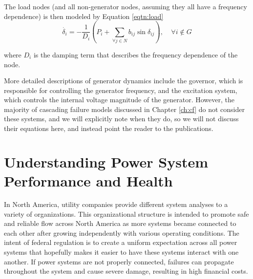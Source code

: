 The load nodes (and all non-generator nodes, assuming they all have a frequency dependence) is then modeled by Equation \ref{eqtn:load}
\begin{equation}
\label{eqtn:load}
\dot{\delta_i} = -\frac{1}{D_i}(P_i + \sum_{\forall j \in N} b_{ij} \sin \delta_{ij}),\ \ \ \ \  \forall i \notin G
\end{equation}

where $D_i$ is the damping term that describes the frequency dependence of the node.  


More detailed descriptions of generator dynamics include the governor, which is responsible for controlling the generator frequency, and the excitation system, which controls the internal voltage magnitude of the generator.  However, the majority of cascading failure models discussed in Chapter \ref{ch:cf} do not consider these systems, and we will explicitly note when they do, so we will not discuss their equations here, and instead point the reader to the publications.


\section{Understanding Power System Performance and Health}
\label{rel_stab_sec}
In North America, utility companies provide different system analyses to a variety of organizations.  This organizational structure is intended to promote safe and reliable flow across North America as more systems became connected to each other after growing independently with various operating conditions.  The intent of federal regulation is to create a uniform expectation across all power systems that hopefully makes it easier to have these systems interact with one another.  If power systems are not properly connected, failures can propagate throughout the system and cause severe damage, resulting in high financial costs.

